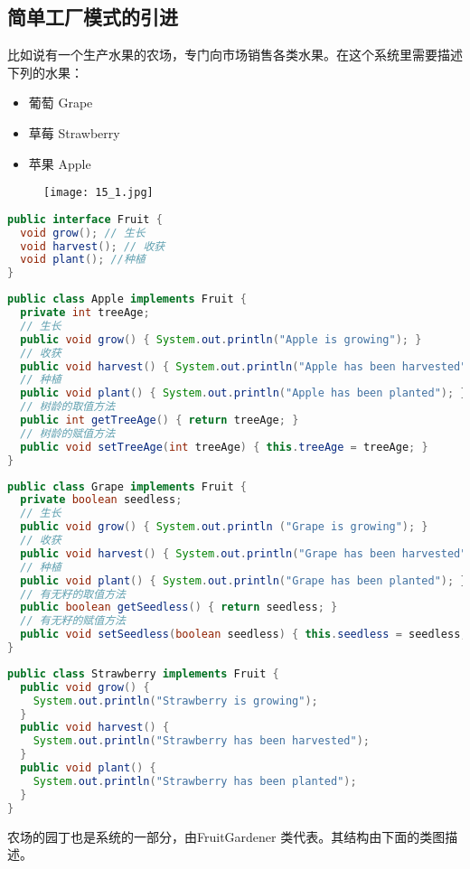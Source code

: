 \documentclass[../main.tex]{subfiles}
\begin{document}
\subsection{简单工厂模式的引进}
\noindent 比如说有一个生产水果的农场，专门向市场销售各类水果。在这个系统里需要描述下列的水果：
\begin{itemize}
  \item 葡萄 Grape
  \item 草莓 Strawberry
  \item 苹果 Apple
\end{itemize}
\begin{figure}[H]
  \texttt{[image: 15\_1.jpg]}
\end{figure}
\begin{lstlisting}[language=java]
public interface Fruit {
  void grow(); // 生长
  void harvest(); // 收获
  void plant(); //种植
}
\end{lstlisting}
\begin{lstlisting}[language=java]
public class Apple implements Fruit {
  private int treeAge;
  // 生长
  public void grow() { System.out.println("Apple is growing"); }
  // 收获
  public void harvest() { System.out.println("Apple has been harvested"); }
  // 种植
  public void plant() { System.out.println("Apple has been planted"); }
  // 树龄的取值方法
  public int getTreeAge() { return treeAge; }
  // 树龄的赋值方法
  public void setTreeAge(int treeAge) { this.treeAge = treeAge; }
}
\end{lstlisting}
\begin{lstlisting}[language=java]
public class Grape implements Fruit {
  private boolean seedless;
  // 生长
  public void grow() { System.out.println ("Grape is growing"); }
  // 收获
  public void harvest() { System.out.println("Grape has been harvested"); }
  // 种植
  public void plant() { System.out.println("Grape has been planted"); }
  // 有无籽的取值方法
  public boolean getSeedless() { return seedless; }
  // 有无籽的赋值方法
  public void setSeedless(boolean seedless) { this.seedless = seedless; }
}
\end{lstlisting}
\begin{lstlisting}[language=java]
public class Strawberry implements Fruit {
  public void grow() {
    System.out.println("Strawberry is growing");
  }
  public void harvest() {
    System.out.println("Strawberry has been harvested");
  }
  public void plant() {
    System.out.println("Strawberry has been planted");
  }
}
\end{lstlisting}
农场的园丁也是系统的一部分，由FruitGardener 类代表。其结构由下面的类图描述。
\end{document}
